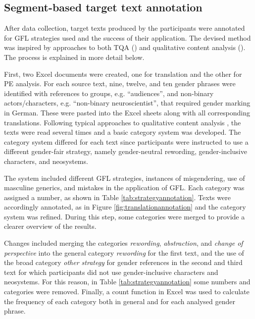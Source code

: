 \subsection{Segment-based target text annotation}  \label{sec:annotation}
After data collection, target texts produced by the participants were annotated for GFL strategies used and the success of their application. The devised method was inspired by approaches to both TQA (\cite{castilho2018approaches}) and qualitative content analysis (\cite{kuckartz2014qualitative}). The process is explained in more detail below. 

First, two Excel documents were created, one for translation and the other for PE analysis. For each source text, nine, twelve, and ten gender phrases were identified with references to groups, e.g. ``audiences'', and non-binary actors/characters, e.g. ``non-binary neuroscientist'', that required gender marking in German. These were pasted into the Excel sheets along with all corresponding translations. Following typical approaches to qualitative content analysis \citep{kuckartz2014qualitative}, the texts were read several times and a basic category system was developed. The category system differed for each text since participants were instructed to use a different gender-fair strategy, namely gender-neutral rewording, gender-inclusive characters, and neosystems. 

The system included different GFL strategies, instances of misgendering, use of masculine generics, and mistakes in the application of GFL. Each category was assigned a number, as shown in Table \ref{tab:strategyannotation}. Texts were accordingly annotated, as in Figure \ref{fig:translationannotation} and the category system was refined. During this step, some categories were merged to provide a clearer overview of the results. 

Changes included merging the categories \textit{rewording}, \textit{abstraction}, and \textit{change of perspective} into the general category \textit{rewording} for the first text, and the use of the broad category \textit{other strategy} for gender references in the second and third text for which participants did not use gender-inclusive characters and neosystems. For this reason, in Table \ref{tab:strategyannotation} some numbers and categories were removed. Finally, a count function in Excel was used to calculate the frequency of each category both in general and for each analysed gender phrase. 

